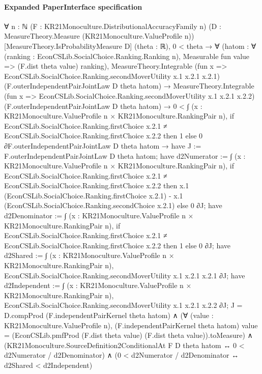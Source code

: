 \documentclass[10pt]{article}
\begin{document}
\paragraph{Expanded PaperInterface specification}
\begin{ReviewVerbatim}
∀ {n : ℕ} (F : KR21Monoculture.DistributionalAccuracyFamily n)
  (D : MeasureTheory.Measure (KR21Monoculture.ValueProfile n)) [MeasureTheory.IsProbabilityMeasure D] (theta : ℝ),
  0 < theta →
    ∀
      (hatom :
        ∀ (ranking : EconCSLib.SocialChoice.Ranking.Ranking n), Measurable fun value => (F.dist theta value) ranking),
      MeasureTheory.Integrable (fun x => EconCSLib.SocialChoice.Ranking.secondMoverUtility x.1 x.2.1 x.2.1)
          (F.outerIndependentPairJointLaw D theta hatom) →
        MeasureTheory.Integrable (fun x => EconCSLib.SocialChoice.Ranking.secondMoverUtility x.1 x.2.1 x.2.2)
            (F.outerIndependentPairJointLaw D theta hatom) →
          0 <
              ∫ (x : KR21Monoculture.ValueProfile n × KR21Monoculture.RankingPair n),
                if
                    EconCSLib.SocialChoice.Ranking.firstChoice x.2.1 ≠
                      EconCSLib.SocialChoice.Ranking.firstChoice x.2.2 then
                  1
                else 0 ∂F.outerIndependentPairJointLaw D theta hatom →
            have J := F.outerIndependentPairJointLaw D theta hatom;
            have d2Numerator :=
              ∫ (x : KR21Monoculture.ValueProfile n × KR21Monoculture.RankingPair n),
                if
                    EconCSLib.SocialChoice.Ranking.firstChoice x.2.1 ≠
                      EconCSLib.SocialChoice.Ranking.firstChoice x.2.2 then
                  x.1 (EconCSLib.SocialChoice.Ranking.firstChoice x.2.1) -
                    x.1 (EconCSLib.SocialChoice.Ranking.secondChoice x.2.1)
                else 0 ∂J;
            have d2Denominator :=
              ∫ (x : KR21Monoculture.ValueProfile n × KR21Monoculture.RankingPair n),
                if
                    EconCSLib.SocialChoice.Ranking.firstChoice x.2.1 ≠
                      EconCSLib.SocialChoice.Ranking.firstChoice x.2.2 then
                  1
                else 0 ∂J;
            have d2Shared :=
              ∫ (x : KR21Monoculture.ValueProfile n × KR21Monoculture.RankingPair n),
                EconCSLib.SocialChoice.Ranking.secondMoverUtility x.1 x.2.1 x.2.1 ∂J;
            have d2Independent :=
              ∫ (x : KR21Monoculture.ValueProfile n × KR21Monoculture.RankingPair n),
                EconCSLib.SocialChoice.Ranking.secondMoverUtility x.1 x.2.1 x.2.2 ∂J;
            J = D.compProd (F.independentPairKernel theta hatom) ∧
              (∀ (value : KR21Monoculture.ValueProfile n),
                  (F.independentPairKernel theta hatom) value =
                    (EconCSLib.pmfProd (F.dist theta value) (F.dist theta value)).toMeasure) ∧
                (KR21Monoculture.SourceDefinition2ConditionalAt F D theta hatom ↔ 0 < d2Numerator / d2Denominator) ∧
                  (0 < d2Numerator / d2Denominator ↔ d2Shared < d2Independent)
\end{ReviewVerbatim}
\end{document}

